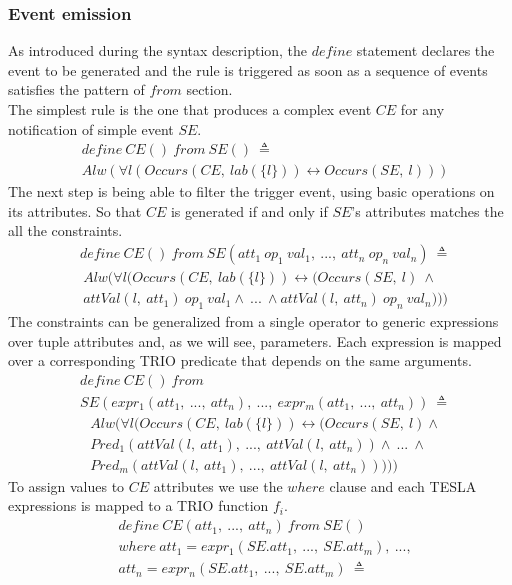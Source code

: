 \subsubsection{Event emission}
As introduced during the syntax description, the $define$ statement declares the event to be generated and the rule is triggered as soon as a sequence of events satisfies the pattern of $from$ section.\\
The simplest rule is the one that produces a complex event $CE$ for any notification of simple event $SE$.
\begin{align*}
&define\ CE()\ from\ SE()\ \triangleq\\
&Alw(\forall l(Occurs(CE,\ lab(\{l\})) \leftrightarrow Occurs(SE,\ l)))
\end{align*}
The next step is being able to filter the trigger event, using basic operations on its attributes. So that $CE$ is generated if and only if $SE$'s attributes matches the all the constraints.
\begin{align*}
&define\ CE()\ from\ SE(att_1\ op_1\ val_1,\ ...,\ att_n\ op_n\ val_n)\ \triangleq
\end{align*}
\begin{align*}
&Alw(\forall l(Occurs(CE,\ lab(\{l\})) \leftrightarrow (Occurs(SE,\ l)\ \wedge\\
&attVal(l,\ att_1)\ op_1\ val_1 \wedge\ ...\ \wedge attVal(l,\ att_n)\ op_n\ val_n)))
\end{align*}
The constraints can be generalized from a single operator to generic expressions over tuple attributes and, as we will see, parameters. Each expression is mapped over a corresponding TRIO predicate that depends on the same arguments.
\begin{align*}
&define\ CE()\ from\\
&SE(expr_1(att_1,\ ...,\ att_n),\ ...,\ expr_m(att_1,\ ...,\ att_n))\ \triangleq
\end{align*}
\begin{align*}
&Alw(\forall l (Occurs(CE,\ lab(\{l\})) \leftrightarrow (Occurs(SE,\ l) \wedge\\
&Pred_1(attVal(l,\ att_1),\ ...,\ attVal(l,\ att_n)) \wedge\ ...\ \wedge\\
&Pred_m(attVal(l,\ att_1),\ ...,\ attVal(l,\ att_n)))))
\end{align*}
To assign values to $CE$ attributes we use the $where$ clause and each TESLA expressions is mapped to a TRIO function $f_i$.
\begin{align*}
&define\ CE(att_1,\ ...,\ att_n)\ from\ SE()\\
&where\ att_1 = expr_1(SE.att_1,\ ...,\ SE.att_m),\ ...,\\
&att_n = expr_n(SE.att_1,\ ...,\ SE.att_m)\ \triangleq
\end{align*}
